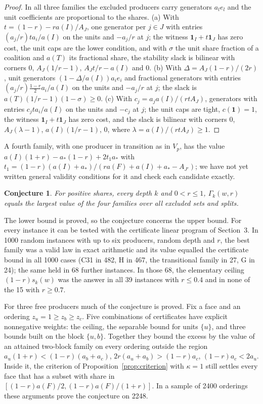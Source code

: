 \documentclass[11pt,a4paper]{article}
\newtheorem{conjecture}[theorem]{Conjecture}
\theoremstyle{remark}
\newcommand{\one}{\mathbf 1}
\begin{document}
\begin{proof}
In all three families the excluded producers carry generators $a_le_l$ and the
unit coefficients are proportional to the shares. (a) With
$t=(1-r)-ra(I)/A_J$, one generator per $j\in J$ with entries
$(a_j/r)ta_i/a(I)$ on the units and $-a_j/r$ at $j$; the witness
$\one_I+t\one_J$ has zero cost, the unit caps are the lower condition, and with
$\sigma$ the unit share fraction of a coalition and $a(T)$ its fractional
share, the stability slack is bilinear with corners $0$, $A_J(1/r-1)$,
$A_Jt/r-a(I)$ and $0$. (b) With $\Delta=A_J(1-r)/(2r)$, unit generators
$(1-\Delta/a(I))a_ie_i$ and fractional generators with entries
$(a_j/r)\frac{1-r}2a_i/a(I)$ on the units and $-a_j/r$ at $j$; the slack is
$a(T)(1/r-1)(1-\sigma)\ge0$. (c) With $c_j=a_ja(I)/(rtA_J)$, generators with
entries $c_jta_i/a(I)$ on the units and $-c_j$ at $j$; the unit caps are tight,
$c(\one)=1$, the witness $\one_I+t\one_J$ has zero cost, and the slack is
bilinear with corners $0$, $A_J(\lambda-1)$, $a(I)(1/r-1)$, $0$, where
$\lambda=a(I)/(rtA_J)\ge1$.
\end{proof}

A fourth family, with one producer in transition as in $V_p$, has the value
$a(I)(1+r)-a_*(1-r)+2t_1a_*$ with
$t_1=(1-r)(a(I)+a_*)/(ra(F)+a(I)+a_*-A_{J'})$; we have not yet written
general validity conditions for it and check each candidate exactly.

\begin{conjecture}\label{conj:closed}
For positive shares, every depth $k$ and $0<r\le1$, $\Gamma_k(w,r)$ equals the
largest value of the four families over all excluded sets and splits.
\end{conjecture}

The lower bound is proved, so the conjecture concerns the upper bound. For
every instance it can be tested with the certificate linear program of
Section~3. In 1000 random instances with up to six producers, random depth
and $r$, the best family was a valid law in exact arithmetic and its value
equalled the certificate bound in all 1000 cases (C31 in 482, H in 467, the
transitional family in 27, G in 24); the same held in 68 further instances.
In those 68, the elementary ceiling $(1-r)s_k(w)$ was the answer in all 39
instances with $r\le0.4$ and in none of the 15 with $r\ge0.7$.

For three free producers much of the conjecture is proved. Fix a face and an
ordering $z_u=1\ge z_b\ge z_c$. Five combinations of certificates have explicit
nonnegative weights: the ceiling, the separable bound for units $\{u\}$, and
three bounds built on the block $\{u,b\}$. Together they bound the excess by
the value of an attained two-block family on every ordering outside the
region $a_u(1+r)<(1-r)(a_b+a_c)$, $2r(a_u+a_b)>(1-r)a_c$, $(1-r)a_c<2a_u$.
Inside it, the criterion of Proposition~\ref{prop:criterion} with $\kappa=1$
still settles every face that has a subset with share in
$[(1-r)a(F)/2,(1-r)a(F)/(1+r)]$. In a sample of 2400 orderings these
arguments prove the conjecture on 2248.
\end{document}
